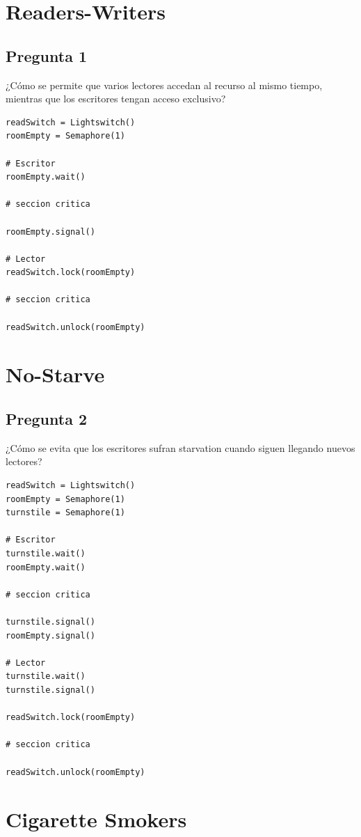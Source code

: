 \documentclass[12pt]{article}
\begin{document}
\section{Readers-Writers}

\subsection{Pregunta 1}

¿Cómo se permite que varios lectores accedan al recurso al mismo tiempo,
mientras que los escritores tengan acceso exclusivo?

\begin{lstlisting}
readSwitch = Lightswitch()
roomEmpty = Semaphore(1)

# Escritor
roomEmpty.wait()

# seccion critica

roomEmpty.signal()

# Lector
readSwitch.lock(roomEmpty)

# seccion critica

readSwitch.unlock(roomEmpty)
\end{lstlisting}

\section{No-Starve}

\subsection{Pregunta 2}

¿Cómo se evita que los escritores sufran starvation cuando siguen llegando
nuevos lectores?

\begin{lstlisting}
readSwitch = Lightswitch()
roomEmpty = Semaphore(1)
turnstile = Semaphore(1)

# Escritor
turnstile.wait()
roomEmpty.wait()

# seccion critica

turnstile.signal()
roomEmpty.signal()

# Lector
turnstile.wait()
turnstile.signal()

readSwitch.lock(roomEmpty)

# seccion critica

readSwitch.unlock(roomEmpty)
\end{lstlisting}

\section{Cigarette Smokers}
\end{document}
